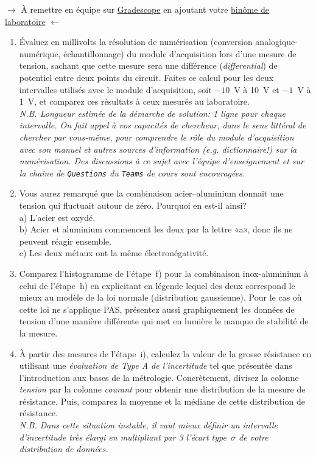 \documentclass[canadien,12pt,oneside,letterpaper]{article}
\begin{document}
\vspace{-0.5cm}
\noindent$\rightarrow$ À remettre en équipe sur \href{https://www.gradescope.com/}{Gradescope} en ajoutant votre \href{https://help.gradescope.com/article/m5qz2xsnjy-student-add-group-members}{binôme de laboratoire} $\leftarrow$

\begin{enumerate}
\item Évaluez en millivolts la résolution de numérisation (conversion analogique-numérique, échantillonnage) du module d'acquisition lors d'une mesure de tension, sachant que cette mesure sera une différence (\textit{differential}) de potentiel entre deux points du circuit. Faites ce calcul pour les deux intervalles utilisés avec le module d'acquisition, soit $-10$~V à 10~V et $-1$~V à 1~V, et comparez ces résultats à ceux mesurés au laboratoire.\\ \emph{N.B. Longueur estimée de la démarche de solution: 1 ligne pour chaque intervalle. On fait appel à vos capacités de chercheur, dans le sens littéral de chercher par vous-même, pour comprendre le rôle du module d'acquisition avec son manuel et autres sources d'information (\emph{e.g.} dictionnaire!) sur la numérisation. Des discussions à ce sujet avec l'équipe d'enseignement et sur la chaîne de \texttt{Questions} du \texttt{Teams} de cours sont encouragées.}
\item Vous aurez remarqué que la combinaison acier--aluminium donnait une tension qui fluctuait autour de zéro. Pourquoi en est-il ainsi?\\a) L'acier est oxydé.\\b) Acier et aluminium commencent les deux par la lettre «a», donc ils ne peuvent réagir ensemble.\\c) Les deux métaux ont la même électronégativité.
\item Comparez l’histogramme de l’étape~f) pour la combinaison inox-aluminium à celui de l’étape~h) en explicitant en légende lequel des deux correspond le mieux au modèle de la loi normale (distribution gaussienne). Pour le cas où cette loi ne s’applique PAS, présentez aussi graphiquement les données de tension d'une manière différente qui met en lumière le manque de stabilité de la mesure.
\item À partir des mesures de l'étape~i), calculez la valeur de la grosse résistance en utilisant une \textit{évaluation de Type A de l'incertitude} tel que présentée dans l’introduction aux bases de la métrologie. Concrètement, divisez la colonne \textit{tension} par la colonne \textit{courant} pour obtenir une distribution de la mesure de résistance. Puis, comparez la moyenne et la médiane de cette distribution de résistance.\\ \textit{N.B. Dans cette situation instable, il vaut mieux définir un intervalle d'incertitude très élargi en multipliant par 3 l'écart type~$\sigma$ de votre distribution de données.}

\end{enumerate}
\end{document}
